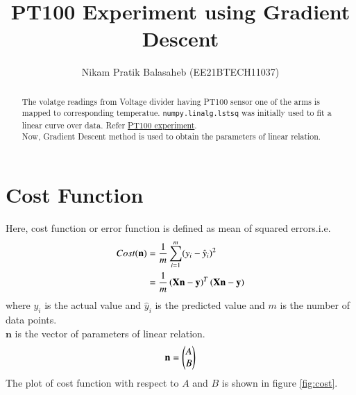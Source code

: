 \documentclass[journal,12pt,twocolumn]{IEEEtran}
\begin{document}
\let\StandardTheFigure\thefigure
\let\vec\mathbf
\renewcommand{\thefigure}{\theproblem}



\def\putbox#1#2#3{\makebox[0in][l]{\makebox[#1][l]{}\raisebox{\baselineskip}[0in][0in]{\raisebox{#2}[0in][0in]{#3}}}}
     \def\rightbox#1{\makebox[0in][r]{#1}}
     \def\centbox#1{\makebox[0in]{#1}}
     \def\topbox#1{\raisebox{-\baselineskip}[0in][0in]{#1}}
     \def\midbox#1{\raisebox{-0.5\baselineskip}[0in][0in]{#1}}

\vspace{3cm}


\title{PT100 Experiment using Gradient Descent}
\author{Nikam Pratik Balasaheb (EE21BTECH11037)}





\maketitle

\newpage


\bigskip

\renewcommand{\thefigure}{\theenumi}
\renewcommand{\thetable}{\theenumi}

\begin{abstract}
	The volatge readings from Voltage divider having PT100 sensor one of the arms is mapped to corresponding temperatue. \texttt{numpy.linalg.lstsq} was initially used to fit a linear curve over data.
	Refer \href{https://github.com/N-Pratik/EE2802/tree/main/PT100}{PT100 experiment}.\\
	Now, Gradient Descent method is used to obtain the parameters of linear relation.
\end{abstract}

\section{Cost Function}

Here, cost function or error function is defined as mean of squared errors.i.e.
\begin{align}
	Cost(\vec{n}) &= \frac{1}{m}\sum_{i=1}^{m} (y_i - \hat{y}_i)^2 \\
	&= \frac{1}{m} \brak{ \vec{X}\vec{n} - \vec{y} }^T \brak{ \vec{X}\vec{n} - \vec{y} }
\end{align}
where $y_i$ is the actual value and $\hat{y}_i$ is the predicted value and $m$ is the number of data points.\\
$\vec{n}$ is the vector of parameters of linear relation.\\
\begin{align}
	\vec{n} = \myvec{A\\B}
\end{align}
The plot of cost function with respect to $A$ and $B$ is shown in figure \ref{fig:cost}.
\end{document}
